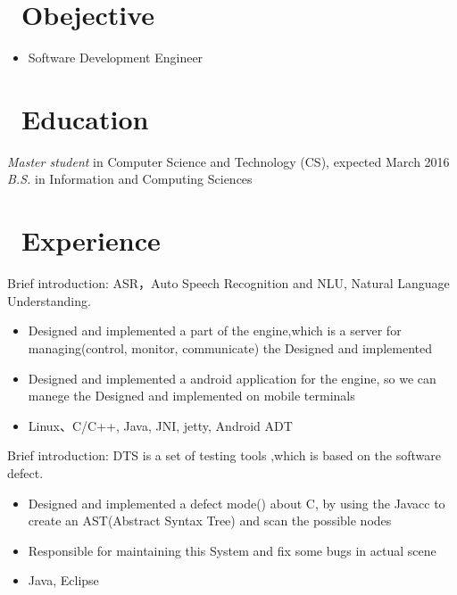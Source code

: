 \documentclass{resume}
\begin{document}


\section{\faSearch\ Obejective}
\begin{itemize}
  \item Software Development Engineer
\end{itemize}

\section{\faGraduationCap\ Education}
\textit{Master student} in Computer Science and Technology (CS), expected March 2016
\textit{B.S.} in Information and Computing Sciences

\section{\faBriefcase\ Experience}
Brief introduction: ASR，Auto Speech Recognition and NLU, Natural Language Understanding.
\begin{itemize}
  \item Designed and implemented a part of the engine,which is a server for managing(control, monitor, communicate) the Designed and implemented
  \item Designed and implemented a android application for the engine, so we can manege the Designed and implemented on mobile terminals
  \item Linux、C/C++, Java, JNI, jetty, Android ADT
\end{itemize}

Brief introduction: DTS is a set of testing tools ,which is based on the software defect.
\begin{itemize}
  \item Designed and implemented a defect mode() about C, by using the Javacc to create an AST(Abstract Syntax Tree) and scan the possible nodes
  \item Responsible for maintaining this System and fix some bugs in actual scene
  \item Java, Eclipse
\end{itemize}
\end{document}
